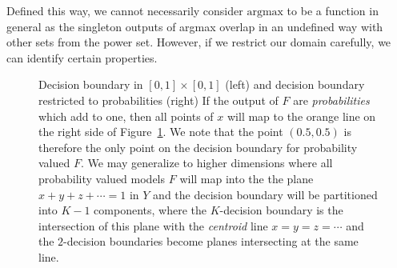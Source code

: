 Defined this way, we cannot necessarily consider $\text{argmax}$ to be a function in general as the singleton outputs of argmax overlap in an undefined way with other sets from the power set. However, if we restrict our domain carefully, we can identify certain properties. 
\begin{figure}[!ht]
\begin{center}

\caption{Decision boundary in $[0,1] \times [0,1]$ (left) and decision boundary restricted to probabilities (right) If the output of $F$ are \emph{probabilities} which add to one, then all points of $x$ will map to the orange line on the right side of Figure~\ref{fig:pdb}. We note that the point $(0.5, 0.5)$ is therefore the only point on the decision boundary for probability valued $F$. We may generalize to higher dimensions where all probability valued models $F$ will map into the the plane $x + y + z + \cdots = 1$ in $Y$ and the decision boundary will be partitioned into $K-1$ components, where the $K$-decision boundary is the intersection of this plane with the \emph{centroid} line $x = y = z = \cdots$ and the $2$-decision boundaries become planes intersecting at the same line. }
\label{fig:pdb}
\end{center}
\end{figure}
